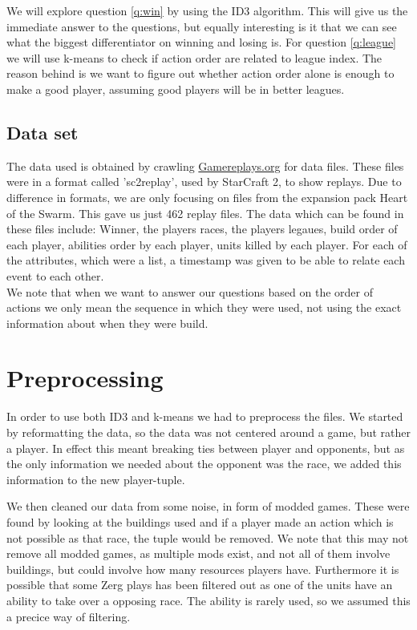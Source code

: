 \documentclass[a4paper,11pt]{article}
\begin{document}
We will explore question \ref{q:win} by using the ID3 algorithm. This will give us the immediate answer to the questions, but equally interesting is it that we can see what the biggest differentiator on winning and losing is. For question \ref{q:league} we will use k-means  to check if action order are related to league index. The reason behind is we want to figure out whether action order alone is enough to make a good player, assuming good players will be in better leagues.

\subsection{Data set}
The data used is obtained by crawling \url{Gamereplays.org} for data files.
These files were in a format called 'sc2replay', used by StarCraft 2, to show replays. Due to difference in formats, we are only focusing on files from the expansion pack Heart of the Swarm. This gave us just 462 replay files. The data which can be found in these files include: Winner, the players races, the players legaues, build order of each player, abilities order by each player, units killed by each player.
For each of the attributes, which were a list, a timestamp was given to be able to relate each event to each other.\\

We note that when we want to answer our questions based on the order of actions we only mean the sequence in which they were used, not using the exact information about when they were build.

\section{Preprocessing}
In order to use both ID3 and k-means we had to preprocess the files. We started by reformatting the data, so the data was not centered around a game, but rather a player.
In effect this meant breaking ties between player and opponents, but as the only information we needed about the opponent was the race, we added this information to the new player-tuple.

We then cleaned our data from some noise, in form of modded games. These were found by looking at the buildings used and if a player made an action which is not possible as that race, the tuple would be removed. We note that this may not remove all modded games, as multiple mods exist, and not all of them involve buildings, but could involve how many resources players have. Furthermore it is possible that some Zerg plays has been filtered out as one of the units have an ability to take over a opposing race. The ability is rarely used, so we assumed this a precice way of filtering.
\end{document}

